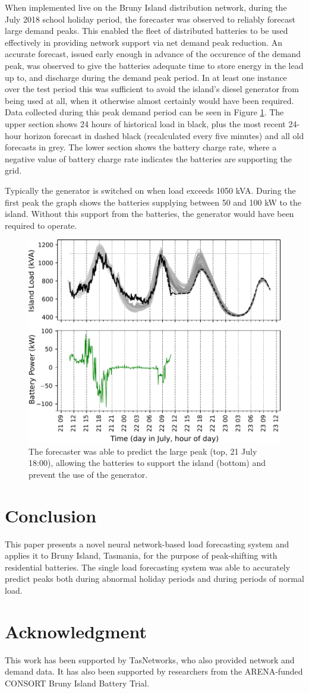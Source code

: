 \documentclass[conference]{IEEEtran}
\begin{document}
When implemented live on the Bruny Island distribution network, during the July 2018 school holiday period, the forecaster was observed to reliably forecast large demand peaks.
This enabled the fleet of distributed batteries to be used effectively in providing network support via net demand peak reduction. An accurate forecast, issued early enough in advance of the occurence of the demand peak, was observed to give the batteries adequate time to store energy in the lead up to, and discharge during the demand peak period. In at least one instance over the test period this was sufficient to avoid the island's diesel generator from being used at all, when it otherwise almost certainly would have been required.
Data collected during this peak demand period can be seen in Figure \ref{fig:bruny_nac}.
The upper section shows 24 hours of historical load in black, plus the most recent 24-hour horizon forecast in dashed black (recalculated every five minutes) and all old forecasts in grey.
The lower section shows the battery charge rate, where a negative value of battery charge rate indicates the batteries are supporting the grid.

Typically the generator is switched on when load exceeds 1050 kVA.
During the first peak the graph shows the batteries supplying between 50 and 100 kW to the island.
Without this support from the batteries, the generator would have been required to operate.

\begin{figure}[htbp]
	\centerline{\includegraphics[width=.35\textwidth]{images/bruny_nac.pdf}}
	\caption{The forecaster was able to predict the large peak (top, 21 July 18:00), allowing the batteries to support the island (bottom) and prevent the use of the generator.}
	\label{fig:bruny_nac}
\end{figure}


\section{Conclusion}
This paper presents a novel neural network-based load forecasting system and applies it to Bruny Island, Tasmania, for the purpose of peak-shifting with residential batteries.
The single load forecasting system was able to accurately predict peaks both during abnormal holiday periods and during periods of normal load.



\section*{Acknowledgment}
This work has been supported by TasNetworks, who also provided network and demand data. It has also been supported by researchers from the ARENA-funded CONSORT Bruny Island Battery Trial.




\end{document}
